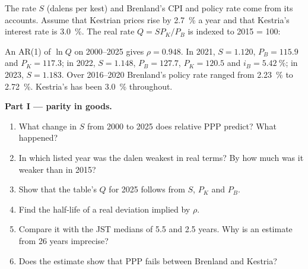 \begin{problem}\label{pb:b3:exchange-rates:dalen}
The rate $S$ (dalens per kest) and Brenland's CPI and policy rate come from its
accounts. Assume that Kestrian prices rise by 2.7~\% a year and that Kestria's
interest rate is 3.0~\%. The real rate $Q = SP_K/P_B$ is indexed to 2015 = 100:
\begin{center}\small
{}
\end{center}
An AR(1) of $\ln Q$ on 2000--2025 gives $\rho = 0.948$. In 2021, $S = 1.120$, $P_B = 115.9$ and
$P_K = 117.3$; in 2022, $S = 1.148$, $P_B = 127.7$, $P_K = 120.5$ and $i_B = 5.42~\%$; in
2023, $S = 1.183$. Over 2016--2020 Brenland's policy rate ranged from 2.23~\% to
2.72~\%. Kestria's has been 3.0~\% throughout. %

\medskip\noindent\textbf{Part I --- parity in goods.}
\begin{enumerate}
\item What change in $S$ from 2000 to 2025 does relative PPP predict? What happened?
\item In which listed year was the dalen weakest in real terms? By how much was it
weaker than in 2015?
\item Show that the table's $Q$ for 2025 follows from $S$, $P_K$ and $P_B$.
\item Find the half-life of a real deviation implied by $\rho$.
\item Compare it with the JST medians of 5.5 and 2.5 years. Why is an estimate from
26 years imprecise?
\item Does the estimate show that PPP fails between Brenland and Kestria?
\end{enumerate}


\end{problem}
